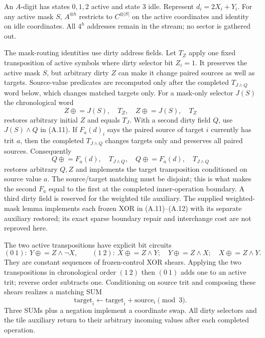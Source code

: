 An $A$-digit has states $0,1,2$ active and state $3$ idle. Represent
$d_i=2X_i+Y_i$. For any active mask $S$, $A^{\otimes h}$ restricts to
$C^{\otimes |S|}$ on the active coordinates and identity on idle
coordinates. All $4^h$ addresses remain in the stream; no sector is
gathered out.

The mask-routing identities use dirty address fields. Let $T_Z$ apply
one fixed transposition of active symbols where dirty selector bit
$Z_i=1$. It preserves the active mask $S$, but arbitrary dirty $Z$
can make it change paired sources as well as targets. Source-value
predicates are recomputed only after the completed $T_{J\wedge Q}$
word below, which changes matched targets only. For a mask-only selector
$J(S)$ the chronological word
\[
 Z\mathrel{\oplus}=J(S),\quad T_Z,\quad
 Z\mathrel{\oplus}=J(S),\quad T_Z                         \tag{A.11}
\]
restores arbitrary initial $Z$ and equals $T_J$. With a second dirty
field $Q$, use $J(S)\wedge Q$ in (A.11). If $F_a(d)_i$ says the paired
source of target $i$ currently has trit $a$, then the completed
$T_{J\wedge Q}$ changes targets only and preserves all paired sources.
Consequently
\[
 Q\mathrel{\oplus}=F_a(d),\quad T_{J\wedge Q},\quad
 Q\mathrel{\oplus}=F_a(d),\quad T_{J\wedge Q}              \tag{A.12}
\]
restores arbitrary $Q,Z$ and implements the target transposition
conditioned on source value $a$. The source/target matching must be
disjoint; this is what makes the second $F_a$ equal to the first at the
completed inner-operation boundary. A third dirty field is reserved for
the weighted tile auxiliary. The supplied weighted-mask lemma implements
each frozen XOR in (A.11)--(A.12) with its separate auxiliary restored;
its exact sparse boundary repair and interchange cost are not reproved
here.

The two active transpositions have explicit bit circuits
\[
 (0\ 1):\ Y\mathrel{\oplus}=Z\wedge\neg X,
 \qquad
 (1\ 2):\ X\mathrel{\oplus}=Z\wedge Y;\quad
 Y\mathrel{\oplus}=Z\wedge X;\quad
 X\mathrel{\oplus}=Z\wedge Y.                           \tag{A.13}
\]
They are constant sequences of frozen-control XOR shears. Applying the
two transpositions in chronological order $(1\ 2)$ then $(0\ 1)$ adds
one to an active trit; reverse order subtracts one. Conditioning on
source trit and composing these shears realizes a matching SUM
\[
 \text{target}_i\gets\text{target}_i+\text{source}_i\pmod3.
                                                               \tag{A.14}
\]
Three SUMs plus a negation implement a coordinate swap. All dirty
selectors and the tile auxiliary return to their arbitrary incoming
values after each completed operation.

